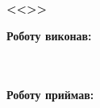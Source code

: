 \begin{titlepage}
    \begin{center}
        \begin{spacing}{1.5}
            \textbf{\Large{\ReportPreamble}} \\
            \vspace{1cm}\textbf{\huge{\ReportName}} \\ 
            \vspace{1cm}\textbf{\large{<<\ReportSubject>>}}
        \end{spacing}
    \end{center}

    \vspace{\fill}

    \newlength{\maxname}
    \settowidth{\maxname}{\small{\TheLongestLabel}}

    \hfill\parbox{\maxname}{
        \begin{spacing}{1.1}
            \small{\textbf{Роботу виконав:}} \\ 
            \small{\AuthorInfo} \\
            \small{\AuthorName} \\
        \end{spacing}
    }

    \hfill\parbox{\maxname}{
        \begin{spacing}{1.1}
            \small{\textbf{Роботу приймав:}} \\ 
            \small{\SupervisorInfo} \\
            \small{\SupervisorName} \\
        \end{spacing}
    }

    \vspace{1cm}
    
    \begin{center}
        \small{\the\year}
    \end{center}
    
\end{titlepage}